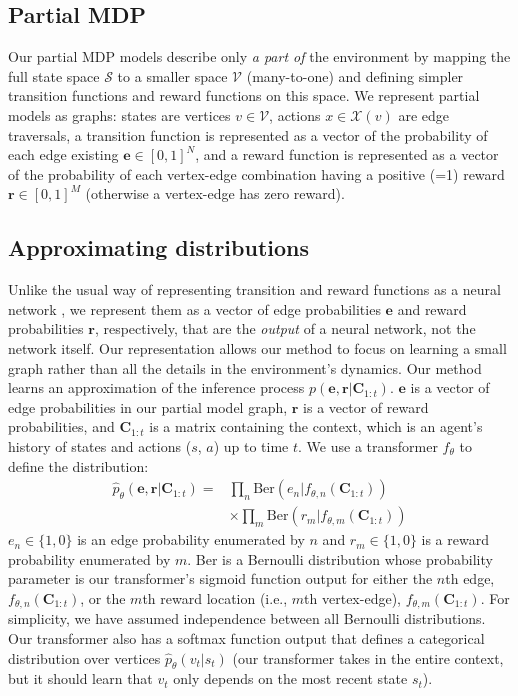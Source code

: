 \documentclass[sigconf]{aamas}
\begin{document}
\subsection{Partial MDP}
Our partial MDP models describe only \textit{a part of} the environment by mapping the full state space $\mathscr{S}$ to a smaller space $\mathscr{V}$ (many-to-one) and defining simpler transition functions and reward functions on this space. We represent partial models as graphs: states are vertices $v \in \mathscr{V}$, actions $x \in \mathscr{X}(v)$ are edge traversals, a transition function is represented as a vector of the probability of each edge existing $\mathbf{e} \in [0,1]^N$, and a reward function is represented as a vector of the probability of each vertex-edge combination having a positive (=1) reward $\mathbf{r} \in [0,1]^M$ (otherwise a vertex-edge has zero reward).
\subsection{Approximating distributions}
Unlike the usual way of representing transition and reward functions as a neural network \citep[e.g.,][]{haWorldModels2018,schrittwieserMasteringAtariGo2020}, we represent them as a vector of edge probabilities $\mathbf{e}$ and reward probabilities $\mathbf{r}$, respectively, that are the \textit{output} of a neural network, not the network itself. Our representation allows our method to focus on learning a small graph rather than all the details in the environment's dynamics.
Our method learns an approximation of the inference process $p(\mathbf{e}, \mathbf{r}|\mathbf{C}_{1:t})$. $\mathbf{e}$ is a vector of edge probabilities in our partial model graph, $\mathbf{r}$ is a vector of reward probabilities, and $\mathbf{C}_{1:t}$ is a matrix containing the context, which is an agent's history of states and actions ($s$, $a$) up to time $t$. We use a transformer $f_{\theta}$ to define the distribution:
\begin{align*}
  \hat{p}_\theta(\mathbf{e}, \mathbf{r}|\mathbf{C}_{1:t}) = &\prod_n \text{Ber}(e_n|f_{\theta,n}(\mathbf{C}_{1:t})) \\
                                                            &\times \prod_m \text{Ber}(r_m|f_{\theta,m}(\mathbf{C}_{1:t}))
\end{align*}
$e_n \in \{1,0\}$ is an edge probability enumerated by $n$ and $r_m \in \{1,0\}$ is a reward probability enumerated by $m$. Ber is a Bernoulli distribution whose probability parameter is our transformer's sigmoid function output for either the $n$th edge, $f_{\theta,n}(\mathbf{C}_{1:t})$, or the $m$th reward location (i.e., $m$th vertex-edge), $f_{\theta,m}(\mathbf{C}_{1:t})$. For simplicity, we have assumed independence between all Bernoulli distributions.
Our transformer also has a softmax function output that defines a categorical distribution over vertices $\hat{p}_\theta(v_t|s_t)$ (our transformer takes in the entire context, but it should learn that $v_t$ only depends on the most recent state $s_t$).
\end{document}
